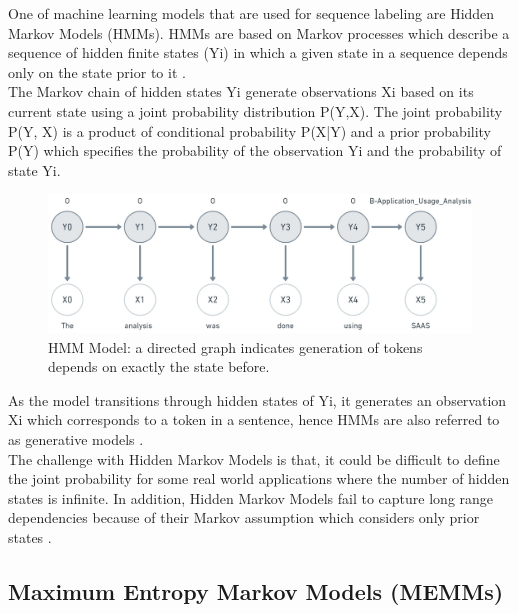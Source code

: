 One of machine learning models that are used for sequence labeling are Hidden Markov Models (HMMs). HMMs are based on Markov processes which describe a sequence of hidden finite states (Yi) in which a given state in a sequence depends only on the state prior to it \citep{aggarwal2018machine, gagniuc2017markov}. \\

The Markov chain of hidden states Yi generate observations Xi based on its current state using a joint probability distribution P(Y,X). The joint probability P(Y, X) is a product of conditional probability  P(X|Y) and a prior probability P(Y) which specifies  the probability of the observation Yi  and the probability of state Yi.  \\

\begin{figure}[htbp]
	\centering
	\includegraphics[width=1\textwidth]{4.graphics/figures/ch_5/HMM}
	\caption{\ac{HMM} Model: a directed graph indicates generation of tokens depends on exactly the state before.}
	\label{fig:chapter03:setup}
\end{figure}

As the model transitions through hidden states of Yi, it generates an observation Xi which corresponds to a token in a sentence, hence HMMs are also referred to as generative models \citep{aggarwal2018machine}. \\


The challenge with Hidden Markov Models is that, it could be difficult to define the joint probability for some real world applications where the number of hidden states is infinite. In addition, Hidden Markov Models fail to capture long range dependencies because of their Markov assumption which considers only prior states \citep{bulla2006application, wallach2004conditional}.
 
\subsection{Maximum Entropy Markov Models (\ac{MEMM}s)}
\label{sec:chapter05:MLModels:MEMMs}

